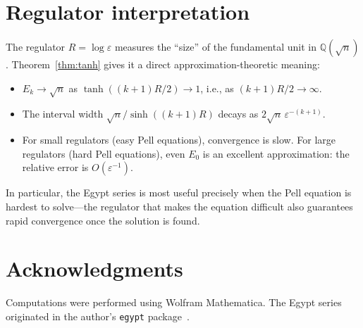 \documentclass[11pt]{article}
\theoremstyle{definition}
\theoremstyle{remark}
\begin{document}
\section{Regulator interpretation}

The regulator $R = \log\varepsilon$ measures the ``size'' of the
fundamental unit in $\mathbb{Q}(\sqrt{n})$.
Theorem~\ref{thm:tanh} gives it a direct approximation-theoretic meaning:

\begin{itemize}
\item $E_k \to \sqrt{n}$ as $\tanh((k{+}1)R/2) \to 1$,
  i.e., as $(k{+}1)R/2 \to \infty$.
\item The interval width $\sqrt{n}/\sinh((k{+}1)R)$
  decays as $2\sqrt{n}\,\varepsilon^{-(k+1)}$.
\item For small regulators (easy Pell equations), convergence is slow.
  For large regulators (hard Pell equations), even $E_0$ is an
  excellent approximation: the relative error is $O(\varepsilon^{-1})$.
\end{itemize}

In particular, the Egypt series is most useful precisely when the
Pell equation is hardest to solve---the regulator that makes the
equation difficult also guarantees rapid convergence once the
solution is found.

\section*{Acknowledgments}

Computations were performed using Wolfram Mathematica.
The Egypt series originated in the author's
\texttt{egypt} package~\cite{egypt-repo}.



\end{document}
